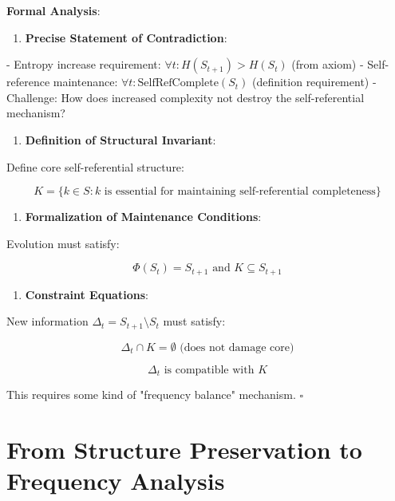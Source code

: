 \textbf{Formal Analysis}:

\begin{enumerate}
\item \textbf{Precise Statement of Contradiction}:
\end{enumerate}
   - Entropy increase requirement: $\forall t: H(S_{t+1}) > H(S_t)$ (from axiom)
   - Self-reference maintenance: $\forall t: \text{SelfRefComplete}(S_t)$ (definition requirement)
   - Challenge: How does increased complexity not destroy the self-referential mechanism?

\begin{enumerate}
\item \textbf{Definition of Structural Invariant}:
\end{enumerate}
   Define core self-referential structure:
   
\begin{equation}
K = \{k \in S: k \text{ is essential for maintaining self-referential completeness}\}
\end{equation}

\begin{enumerate}
\item \textbf{Formalization of Maintenance Conditions}:
\end{enumerate}
   Evolution must satisfy:
   
\begin{equation}
\Phi(S_t) = S_{t+1} \text{ and } K \subseteq S_{t+1}
\end{equation}

\begin{enumerate}
\item \textbf{Constraint Equations}:
\end{enumerate}
   New information $\Delta_t = S_{t+1} \setminus S_t$ must satisfy:
   
\begin{equation}
\Delta_t \cap K = \emptyset \text{ (does not damage core)}
\end{equation}
   
\begin{equation}
\Delta_t \text{ is compatible with } K
\end{equation}

This requires some kind of "frequency balance" mechanism. $\square$

\section{From Structure Preservation to Frequency Analysis}
\label{sec:ch04_riemann:from-structure-preservation-to-frequency-analysis}

